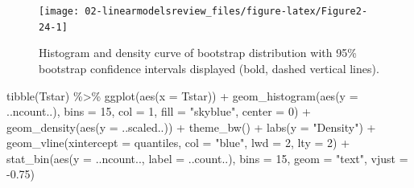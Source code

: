 \documentclass[
]{book}
\newenvironment{Shaded}{\begin{snugshade}}{\end{snugshade}}
\newcommand{\AttributeTok}[1]{\textcolor[rgb]{0.77,0.63,0.00}{#1}}
\newcommand{\DecValTok}[1]{\textcolor[rgb]{0.00,0.00,0.81}{#1}}
\newcommand{\FloatTok}[1]{\textcolor[rgb]{0.00,0.00,0.81}{#1}}
\newcommand{\FunctionTok}[1]{\textcolor[rgb]{0.00,0.00,0.00}{#1}}
\newcommand{\NormalTok}[1]{#1}
\newcommand{\SpecialCharTok}[1]{\textcolor[rgb]{0.00,0.00,0.00}{#1}}
\newcommand{\StringTok}[1]{\textcolor[rgb]{0.31,0.60,0.02}{#1}}
\begin{document}
\begin{figure}[ht!]

{\centering \texttt{[image: 02-linearmodelsreview\_files/figure-latex/Figure2-24-1]} 

}

\caption{Histogram and density curve of bootstrap distribution with 95\% bootstrap confidence intervals displayed (bold, dashed vertical lines).}\label{fig:Figure2-24}
\end{figure}

\begin{Shaded}
\begin{Highlighting}[]
\FunctionTok{tibble}\NormalTok{(Tstar) }\SpecialCharTok{\%\textgreater{}\%} \FunctionTok{ggplot}\NormalTok{(}\FunctionTok{aes}\NormalTok{(}\AttributeTok{x =}\NormalTok{ Tstar)) }\SpecialCharTok{+} 
  \FunctionTok{geom\_histogram}\NormalTok{(}\FunctionTok{aes}\NormalTok{(}\AttributeTok{y =}\NormalTok{ ..ncount..), }\AttributeTok{bins =} \DecValTok{15}\NormalTok{, }\AttributeTok{col =} \DecValTok{1}\NormalTok{, }\AttributeTok{fill =} \StringTok{"skyblue"}\NormalTok{, }\AttributeTok{center =} \DecValTok{0}\NormalTok{) }\SpecialCharTok{+} 
  \FunctionTok{geom\_density}\NormalTok{(}\FunctionTok{aes}\NormalTok{(}\AttributeTok{y =}\NormalTok{ ..scaled..)) }\SpecialCharTok{+}
  \FunctionTok{theme\_bw}\NormalTok{() }\SpecialCharTok{+}
  \FunctionTok{labs}\NormalTok{(}\AttributeTok{y =} \StringTok{"Density"}\NormalTok{) }\SpecialCharTok{+}
  \FunctionTok{geom\_vline}\NormalTok{(}\AttributeTok{xintercept =}\NormalTok{ quantiles, }\AttributeTok{col =} \StringTok{"blue"}\NormalTok{, }\AttributeTok{lwd =} \DecValTok{2}\NormalTok{, }\AttributeTok{lty =} \DecValTok{2}\NormalTok{) }\SpecialCharTok{+}
  \FunctionTok{stat\_bin}\NormalTok{(}\FunctionTok{aes}\NormalTok{(}\AttributeTok{y =}\NormalTok{ ..ncount.., }\AttributeTok{label =}\NormalTok{ ..count..), }\AttributeTok{bins =} \DecValTok{15}\NormalTok{, }
           \AttributeTok{geom =} \StringTok{"text"}\NormalTok{, }\AttributeTok{vjust =} \SpecialCharTok{{-}}\FloatTok{0.75}\NormalTok{)}
\end{Highlighting}
\end{Shaded}
\end{document}
